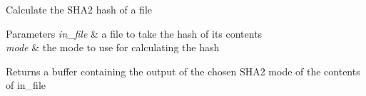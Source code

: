 Calculate the S\+H\+A2 hash of a file


\begin{DoxyParams}{Parameters}
{\em in\+\_\+file} & a file to take the hash of it\textquotesingle{}s contents \\
\hline
{\em mode} & the mode to use for calculating the hash \\
\hline
\end{DoxyParams}
\begin{DoxyReturn}{Returns}
a buffer containing the output of the chosen S\+H\+A2 mode of the contents of in\+\_\+file 
\end{DoxyReturn}
